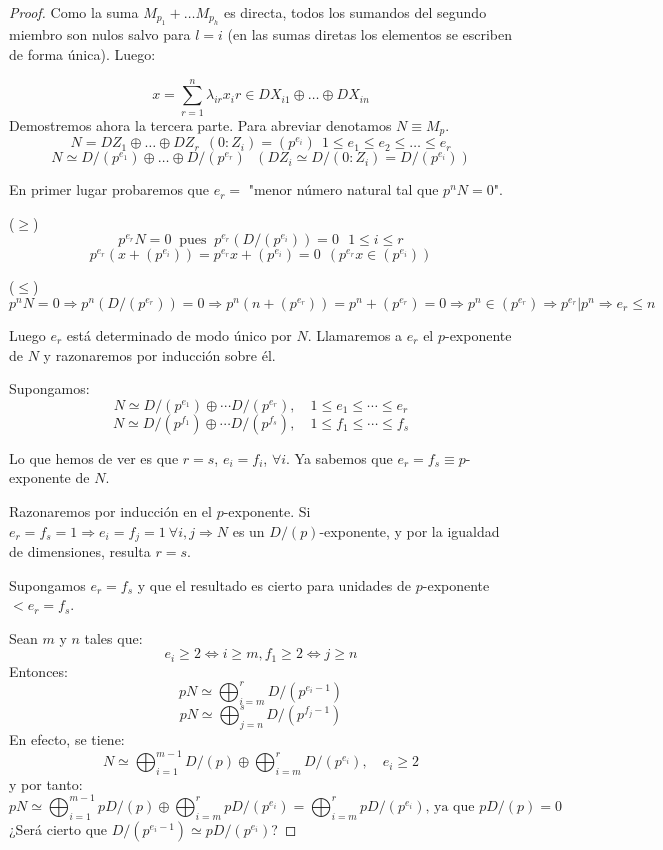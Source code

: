 \documentclass{article}
\theoremstyle{theorem-style}  %
\theoremstyle{definition}
\theoremstyle{example-style}
\begin{document}
\begin{proof}
		Como la suma $M_{p_1}+\dots M_{p_h}$ es directa, todos los sumandos del segundo miembro son nulos salvo para $l=i$ (en las sumas diretas los elementos se escriben de forma única). Luego:

		\[x=\sum_{r=1}^n\lambda_{ir}x_ir \in DX_{i1}\oplus\dots\oplus DX_{in}\]
		Demostremos ahora la tercera parte. Para abreviar denotamos $N\equiv M_p$.
		\[N=DZ_1\oplus\dots\oplus DZ_r \ \ (0:Z_i)=(p^{e_i}) \ \ 1\leq e_1\leq e_2 \leq\dots\leq e_r\]
		\[N\simeq D/(p^{e_1})\oplus\dots\oplus D/(p^{e_r}) \ \ \ (DZ_i\simeq D/(0:Z_i)=D/(p^{e_i})) \]

		En primer lugar probaremos que $e_r=$ "menor número natural tal que $p^nN=0$".

		($\geq$)
		\[p^{e_r}N=0 \  \text{ pues } \ p^{e_r}(D/(p^{e_i}))=0 \ \ \ 1\leq i\leq r\]
		\[p^{e_r}(x+(p^{e_i}))=p^{e_r}x+(p^{e_i})=0 \ \ (p^{e_r}x\in (p^{e_i}))\]

		($\leq$)
		\[p^nN=0\Rightarrow p^n(D/(p^{e_r}))=0 \Rightarrow p^n(n+(p^{e_r}))=p^n+(p^{e_r})=0 \Rightarrow p^n\in (p^{e_r}) \Rightarrow p^{e_r}|p^n \Rightarrow e_r \leq n\]

		Luego $e_r$ está determinado de modo único por $N$. Llamaremos a $e_r$ el $p$-exponente de $N$ y razonaremos por inducción sobre él.

		Supongamos:
		\[ N\simeq D/(p^{e_1}) \oplus \cdots D/(p^{e_r}), \quad 1\leq e_1\leq\cdots\leq e_r \]
		\[ N\simeq D/(p^{f_1}) \oplus \cdots D/(p^{f_s}), \quad 1\leq f_1\leq\cdots\leq f_s \]

		Lo que hemos de ver es que $ r=s $, $ e_i=f_i $, $ \forall i $.
		Ya sabemos que $ e_r=  f_s\equiv p$-exponente de $ N $.

		Razonaremos por inducción en el $ p $-exponente.
		Si $ e_r=f_s=1 \Rightarrow e_i=f_j=1 \ \forall i,j \Rightarrow N $ es un $ D/(p) $-exponente, y por la igualdad de dimensiones, resulta $ r=s $.

		Supongamos $ e_r=f_s $ y que el resultado es cierto para unidades de $ p $-exponente $ <e_r=f_s $.

		Sean $ m $ y $ n $ tales que:
		\[ e_i\geq 2\Leftrightarrow i\geq m, f_1 \geq 2 \Leftrightarrow j \geq n \]
		Entonces:
		\[ pN\simeq \bigoplus_{i=m}^r D/(p^{e_i-1})  \]
		\[ pN\simeq \bigoplus_{j=n}^s D/(p^{f_j-1})  \]
		En efecto, se tiene:
		\[ N\simeq \bigoplus_{i=1}^{m-1} D/(p) \oplus  \bigoplus_{i=m}^{r}D/(p^{e_i}), \quad e_i \geq 2  \]
		y por tanto:
		\[ pN\simeq \bigoplus_{i=1}^{m-1} pD/(p) \oplus  \bigoplus_{i=m}^{r}pD/(p^{e_i}) = \bigoplus_{i=m}^{r}pD/(p^{e_i}) \text{, ya que } pD/(p)=0 \]
		¿Será cierto que $ D/(p^{e_i-1})\simeq pD/(p^{e_i}) $?


\end{proof}
\end{document}
